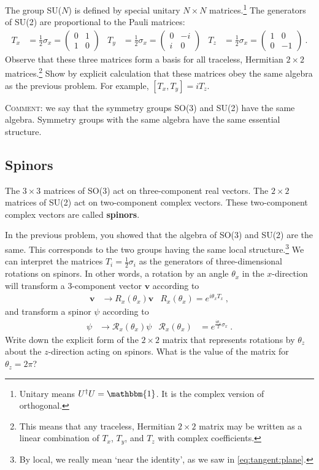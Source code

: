 \documentclass[12pt]{article}
\numberwithin{equation}{section}    %
\renewcommand{\vec}[1]{\mathbf{#1}} %
\begin{document}
The group SU($N$) is defined by special unitary $N\times N$ matrices.\footnote{Unitary means $U^\dag U = \mathbbm{1}$. It is the complex version of orthogonal.} The generators of SU(2) are proportional to the Pauli matrices:
\begin{align}
	T_x &= \frac{1}{2}\sigma_x
	= \begin{pmatrix}
		0 & 1 \\ 
		1 & 0
	\end{pmatrix}
	&
	T_y &= \frac{1}{2}\sigma_x
	= \begin{pmatrix}
		0 & -i \\ 
		i & 0
	\end{pmatrix}
	&
	T_z &= \frac{1}{2}\sigma_x
	= \begin{pmatrix}
		1 & 0 \\ 
		0 & -1
	\end{pmatrix} \ .
	\label{eq:pauli}
\end{align}
Observe that these three matrices form a basis for all traceless, Hermitian  $2\times 2$ matrices.\footnote{This means that any traceless, Hermitian $2\times 2$ matrix may be written as a linear combination of $T_x$, $T_y$, and $T_z$ with complex coefficients.} Show by explicit calculation that these matrices obey the same algebra as the previous problem. For example, $[T_x, T_y] = iT_z$. 

\textsc{Comment:} we say that the symmetry groups SO(3) and SU(2) have the same algebra. Symmetry groups with the same algebra have the same essential structure.

\subsection{Spinors}

The $3\times 3$ matrices of SO(3) act on three-component real vectors. The $2\times 2$ matrices of SU(2) act on two-component complex vectors. These two-component complex vectors are called \textbf{spinors}.

In the previous problem, you showed that the algebra of SO(3) and SU(2) are the same. This corresponds to the two groups having the same local structure.\footnote{By local, we really mean `near the identity', as we saw in \eqref{eq:tangent:plane}.} We can interpret the matrices $T_i = \frac{1}{2} \sigma_i$ as the generators of three-dimensional rotations on spinors. In other words, a rotation by an angle $\theta_x$ in the $x$-direction will transform a 3-component vector $\vec{v}$ according to
\begin{align}
	\vec{v} &\to R_x(\theta_x) \vec{v} 
	&
	R_x(\theta_x) = e^{i\theta_x T_x}
	\ ,
\end{align}
and transform a spinor $\psi$ according to
\begin{align}
	\psi &\to \mathcal R_x(\theta_x) \psi 
	&
	\mathcal R_x(\theta_x) &= e^{\frac{i\theta_x}{2}\sigma_x} \ .
\end{align}
Write down the explicit form of the $2\times 2$ matrix that represents rotations by $\theta_z$ about the $z$-direction acting on spinors. What is the value of the matrix for $\theta_z = 2\pi$?
\end{document}
